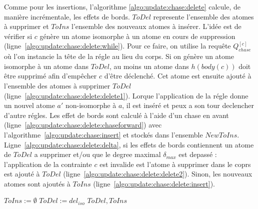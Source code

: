 Comme pour les insertions, l'algorithme \ref{algo:update:chase:delete} calcule, de manière incrémentale, les effets de bords.
$ToDel$ represente l'ensemble des atomes à supprimer et $ToIns$ l'ensemble des nouveaux atomes à insérer.
L'idée est de vérifier si $c$ génère un atome isomorphe à un atome en cours de suppression (ligne~\ref{algo:update:chase:delete:while}).
Pour ce faire, on utilise la requête $Q_{chase}^{[c]}$ où l'on instancie la tête de la régle au lieu du corps.
Si on génère un atome isomorphe à un atome dans $ToDel$, au moins un atome dans $h(body(c))$ doit être supprimé afin d'empêcher $c$ d'être déclenché.
Cet atome est ensuite ajouté à l'ensemble des atomes à supprimer $ToDel$ (ligne~\ref{algo:update:chase:delete:delete1}).
Lorque l'application de la régle donne un nouvel atome $a'$ non-isomorphe à $a$, il est inséré et peux a son tour declencher d'autre régles.
Les effet de bords sont calculé à l'aide d'un \gls{chase} en avant (ligne~\ref{algo:update:chase:delete:chaseforward}) avec l'algorithme~\ref{algo:update:chase:insert} et stockés dans l'ensemble $NewToIns$.
Ligne~\ref{algo:update:chase:delete:delta}, si les effets de bords contiennent un atome de $ToDel$ a supprimer et/ou que le degree maximal $\delta_{max}$ est depassé : l'application de la contrainte $c$ est invalide est l'atome à supprimer dans le coprs est ajouté à $ToDel$ (ligne~\ref{algo:update:chase:delete:delete2}).
Sinon, les nouveaux atomes sont ajoutés à $ToIns$ (ligne~\ref{algo:update:chase:delete:insert}).

\begin{algorithm}[ht]
	\caption{$\textsc{Chase4Delete}(\mathcal{D}, \mathbb{C}, \delta_{max}, del_{iso})$}
    \label{algo:update:chase:delete}
	$ToIns := \emptyset$
    $ToDel := del_{iso}$ \;
	\Return $ToDel, ToIns$
\end{algorithm}

\begin{example}
    \label{ex:update:chase:backward}

\end{example}
